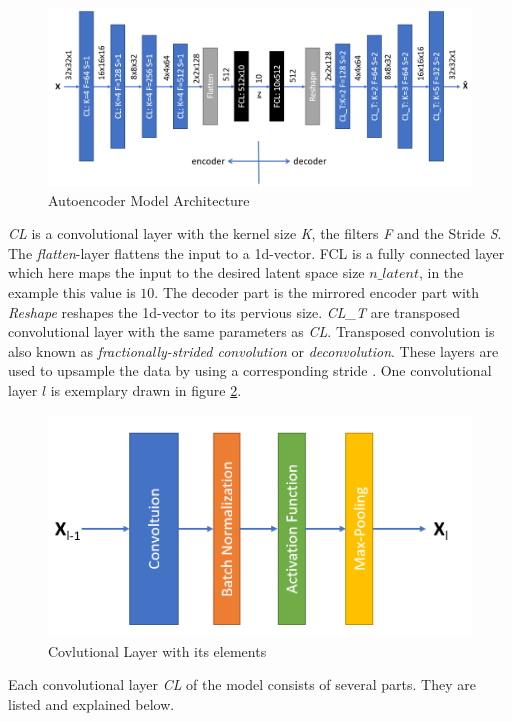 \documentclass[12pt,DIV14,BCOR12mm,a4paper,footexclude,headinclude,halfparskip-,twoside,openright,cleardoubleempty,idxtotoc,bibtotoc,listtotoc,abstracton]{scrreprt} %
\numberwithin{equation}{chapter}
\begin{document}
\begin{figure}[htb!]
	\centering
	\includegraphics[width=0.9\linewidth]{Graphiken/Autoencoder_Model}
	\caption{Autoencoder Model Architecture}
	\label{fig:AE_ModelArchitecture}
\end{figure}
\textit{CL} is a convolutional layer with the kernel size \textit{K}, the filters \textit{F} and the Stride \textit{S}. The \textit{flatten}-layer flattens the input to a 1d-vector. FCL is a fully connected layer which here maps the input to the desired latent space size $n\_latent$, in the example this value is $10$. The decoder part is the mirrored encoder part with \textit{Reshape} reshapes the 1d-vector to its pervious size. \textit{CL\_T} are transposed convolutional layer with the same parameters as \textit{CL}. Transposed convolution is also known as \textit{fractionally-strided convolution} or \textit{deconvolution}. These layers are used to upsample the data by using a corresponding stride \cite{DeepLearningDive}. One convolutional layer $l$ is exemplary drawn in figure \ref{fig:Conv_layer}.
\begin{figure}[htb!]
	\centering
	\includegraphics[width=0.5\linewidth]{Graphiken/ConvolutionalLayer}
	\caption{Covlutional Layer with its elements}
	\label{fig:Conv_layer}
\end{figure}
Each convolutional layer \textit{CL} of the model consists of several parts. They are listed and explained below.\\
\end{document}
